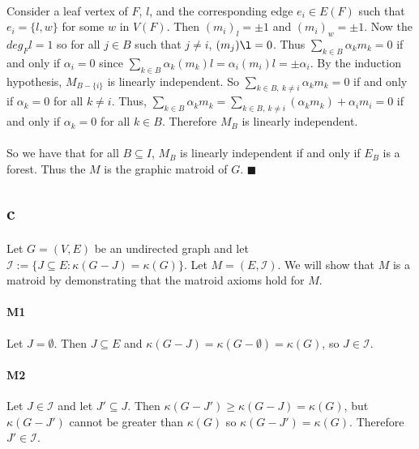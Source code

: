 \documentclass[letterpaper,12pt,oneside,onecolumn]{report}
\begin{document}
\paragraph{}
Consider a leaf vertex of $F$, $l$, and the corresponding edge $e_i \in E(F)$ such that $e_i = \{l,w\}$ for some $w$ in $V(F)$. Then $(m_i)_l = \pm 1$ and $(m_i)_w = \pm 1$. Now the $deg_Fl = 1$ so for all $j \in B$ such that $j \neq i$, $(m_j)\l = 0$. Thus $\sum_{k \in B} \alpha_k m_k = 0$ if and only if $\alpha_i = 0$ since $\sum_{k \in B} \alpha_k (m_k)l = \alpha_i (m_i )l = \pm \alpha_i$. By the induction hypothesis, $M_{B-\{i\}}$ is linearly independent. So $\sum_{k \in B,\ k\neq i} \alpha_k m_k = 0$ if and only if $\alpha_k = 0$ for all $k \neq i$. Thus, $\sum_{k \in B} \alpha_k m_k = \sum_{k \in B,\ k\neq i} (\alpha_k m_k) + \alpha_i m_i = 0$ if and only if $\alpha_k = 0$ for all $k \in B$. Therefore $M_B$ is linearly independent. 
\paragraph{}
So we have that for all $B \subseteq I$, $M_B$ is linearly independent if and only if $E_B$ is a forest. Thus the $M$ is the graphic matroid of $G$. $\blacksquare$
\subsection*{c}
\paragraph{}
Let $G = (V,E)$ be an undirected graph and let $\mathcal{I} := \{J \subseteq E : \kappa(G - J) = \kappa(G)\}$. Let $M = (E,\mathcal{I})$. We will show that $M$ is a matroid by demonstrating that the matroid axioms hold for $M$.
\paragraph{M1}
Let $J = \emptyset$. Then $J \subseteq E$ and $\kappa(G-J)  = \kappa(G - \emptyset) = \kappa(G)$, so $J \in \mathcal{I}$.
\paragraph{M2}
Let $J \in \mathcal{I}$ and let $J' \subseteq J$. Then $\kappa(G-J') \geq \kappa(G-J) = \kappa(G)$, but $\kappa(G-J')$ cannot be greater than $\kappa(G)$ so $\kappa(G-J') = \kappa(G)$. Therefore $J' \in \mathcal{I}$.
\end{document}
